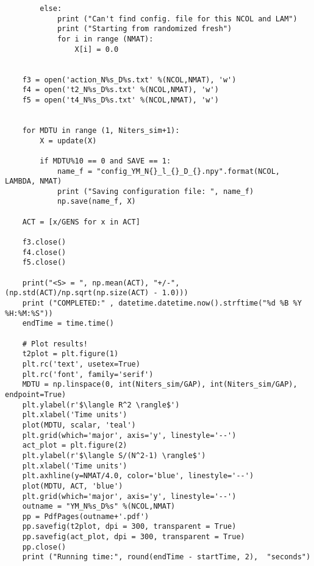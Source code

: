 \begin{lstlisting}
        else: 
            print ("Can't find config. file for this NCOL and LAM")
            print ("Starting from randomized fresh")
            for i in range (NMAT):  
                X[i] = 0.0


    f3 = open('action_N%s_D%s.txt' %(NCOL,NMAT), 'w')
    f4 = open('t2_N%s_D%s.txt' %(NCOL,NMAT), 'w')
    f5 = open('t4_N%s_D%s.txt' %(NCOL,NMAT), 'w')


    for MDTU in range (1, Niters_sim+1): 
        X = update(X)

        if MDTU%10 == 0 and SAVE == 1:
            name_f = "config_YM_N{}_l_{}_D_{}.npy".format(NCOL, LAMBDA, NMAT)
            print ("Saving configuration file: ", name_f)
            np.save(name_f, X)

    ACT = [x/GENS for x in ACT] 

    f3.close()
    f4.close()
    f5.close()
    
    print("<S> = ", np.mean(ACT), "+/-", (np.std(ACT)/np.sqrt(np.size(ACT) - 1.0)))
    print ("COMPLETED:" , datetime.datetime.now().strftime("%d %B %Y %H:%M:%S")) 
    endTime = time.time() 

    # Plot results!
    t2plot = plt.figure(1) 
    plt.rc('text', usetex=True)
    plt.rc('font', family='serif')
    MDTU = np.linspace(0, int(Niters_sim/GAP), int(Niters_sim/GAP), endpoint=True)
    plt.ylabel(r'$\langle R^2 \rangle$')
    plt.xlabel('Time units')
    plot(MDTU, scalar, 'teal') 
    plt.grid(which='major', axis='y', linestyle='--')
    act_plot = plt.figure(2) 
    plt.ylabel(r'$\langle S/(N^2-1) \rangle$')
    plt.xlabel('Time units')
    plt.axhline(y=NMAT/4.0, color='blue', linestyle='--')
    plot(MDTU, ACT, 'blue') 
    plt.grid(which='major', axis='y', linestyle='--')
    outname = "YM_N%s_D%s" %(NCOL,NMAT)
    pp = PdfPages(outname+'.pdf')
    pp.savefig(t2plot, dpi = 300, transparent = True)
    pp.savefig(act_plot, dpi = 300, transparent = True)
    pp.close()
    print ("Running time:", round(endTime - startTime, 2),  "seconds")
\end{lstlisting}